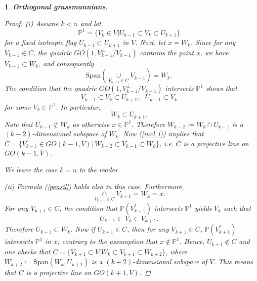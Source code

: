 \documentclass[12pt]{amsart}
\newcommand\Span{\text{Span}}
\newtheorem{sub}[subsection]{}
\theoremstyle{definition}
\begin{document}
\begin{sub}{\bf Orthogonal grassmannians.}
\begin{proof}
(i) Assume $k<n$ and let
\begin{equation}\label{pensil}
\mathbb{P}^1=\{V_k\in V|U_{k-1}\subset V_k\subset U_{k+1}\}
\end{equation}
for a fixed isotropic flag $U_{k-1}\subset U_{k+1}$ in $V$.
Next, let $x=W_k$. Since for any $V_{k-1}\in C$, the quadric $GO(1,V_{k-1}^\bot/V_{k-1})$ contains
the point $x$, we have $V_{k-1}\subset W_k$, and consequently
$$
\Span(\underset{V_{k-1}\in C}{\cup}V_{k-1})=W_k.
$$
The condition that the quadric $GO(1,V_{k-1}^\bot/V_{k-1})$ intersects $\mathbb{P}^1$ shows that
\begin{equation}\label{incl 1}
V_{k-1}\subset V_k\subset U_{k+1},\ \ \ U_{k-1}\subset V_k
\end{equation}
for some $V_k\in\mathbb{P}^1$. In particular,
$$
W_k\subset U_{k+1}.
$$
Note that $U_{k-1}\not\subset W_k$ as otherwise $x\in\mathbb{P}^1$.
Therefore $W_{k-2}:=W_k\cap U_{k-1}$ is a
$(k-2)$-dimensional subspace of $W_k$. Now (\ref{incl 1}) implies that
$C=\{V_{k-1}\in GO(k-1,V)|\ W_{k-2}\subset V_{k-1}\subset W_k\}$, i.e. $C$ is a projective line on $GO(k-1,V)$.

We leave the case $k=n$ to the reader.


(ii) Formula (\ref{pensil}) holds also in this case. Furthermore,
$$
\underset{V_{k+1}\in C}{\cap}V_{k+1}=W_k=x.
$$
For any $V_{k+1}\in C$, the condition that  $\mathbb{P}(V_{k+1}^*)$ intersects $\mathbb{P}^1$ yields
$V_k$ such that
$$
U_{k-1}\subset V_k\subset V_{k+1}.
$$
Therefore $U_{k-1}\subset W_k$. Now if $U_{k+1}\in C$, then for any $V_{k+1}\in C$, $\mathbb{P}(V_{k+1}^*)$ intersects
$\mathbb{P}^1$ in $x$, contrary to the assumption that $x\not\in\mathbb{P}^1$. Hence, $U_{k+1}\not\in C$ and one checks
that $C=\{V_{k+1}\subset V|W_k\subset V_{k+1}\subset W_{k+2}\}$, where
$W_{k+2}:=\Span(W_k,U_{k+1})$ is a $(k+2)$-dimensional subspace of $V$. This means
that $C$ is a projective line on $GO(k+1,V)$.


\end{proof}




\end{sub}
\end{document}
